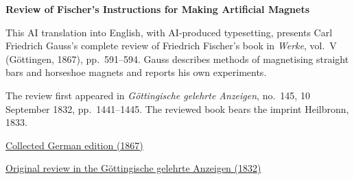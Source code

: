 \clearpage
\thispagestyle{empty}
\begin{center}\Large\textbf{Review of Fischer’s Instructions for Making Artificial Magnets}\end{center}

This AI translation into English, with AI-produced typesetting, presents Carl Friedrich Gauss’s complete review of Friedrich Fischer’s book in \textit{Werke}, vol.~V (Göttingen, 1867), pp.~591--594. Gauss describes methods of magnetising straight bars and horseshoe magnets and reports his own experiments.

The review first appeared in \textit{Göttingische gelehrte Anzeigen}, no.~145, 10 September 1832, pp.~1441--1445. The reviewed book bears the imprint Heilbronn, 1833.

\medskip\noindent
\href{https://gdz.sub.uni-goettingen.de/id/PPN236006339}{Collected German edition (1867)}\par
\noindent\href{https://gdz.sub.uni-goettingen.de/id/PPN385030444_1832_2}{Original review in the Göttingische gelehrte Anzeigen (1832)}
\clearpage
